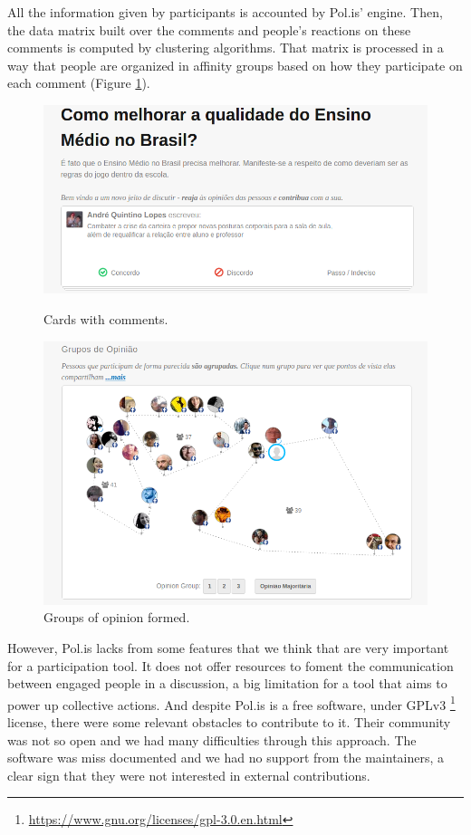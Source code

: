 \documentclass{llncs}
\begin{document}
  All the information given by participants is accounted by Pol.is' engine.
Then, the data matrix built over the comments and people's reactions on these
comments is computed by clustering algorithms. That matrix is processed in
a way that people are organized in affinity groups based on how they participate
on each comment (Figure \ref{fig:polis-2}). 

 \begin{figure}[hbt]
   \centering
   \begin{minipage}{.50\textwidth}
     \includegraphics[width=.9\linewidth]{images/polis1.png}
     \caption{Cards with comments.}
     \label{fig:polis-1}
   \end{minipage}
   \begin{minipage}{.49\textwidth}
     \includegraphics[width=.9\linewidth]{images/polis2.png}
     \caption{Groups of opinion formed.}
     \label{fig:polis-2}
   \end{minipage}
 \end{figure}

  However, Pol.is lacks from some features that we think that are very important
for a participation tool. It does not offer resources to foment the communication
between engaged people in a discussion, a big limitation for a tool that
aims to power up collective actions. And despite Pol.is is a free software, under
GPLv3 \footnote{\url{https://www.gnu.org/licenses/gpl-3.0.en.html}}
license, there were some relevant obstacles to contribute to it. Their community
was not so open and we had many difficulties through this approach.
The software was miss documented and we had no support from the maintainers, a
clear sign that they were not interested in external contributions.
\end{document}
